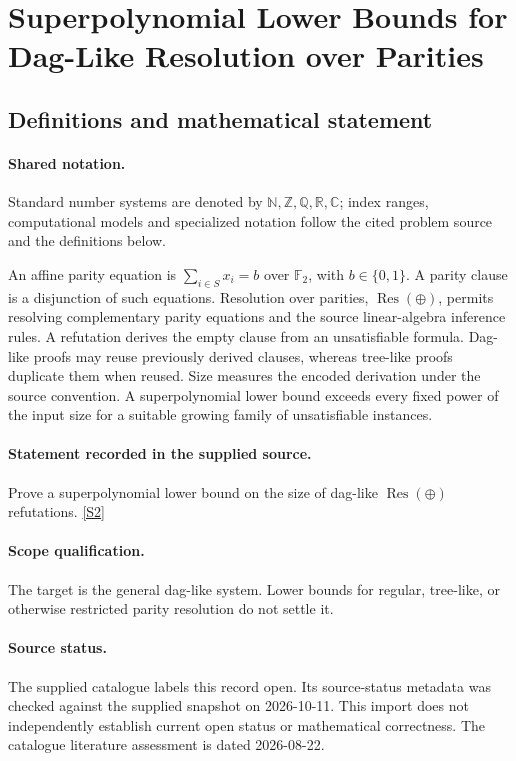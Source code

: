\documentclass[11pt]{article}
\newcommand{\sref}[2]{\hyperlink{source:#1:#2}{[S#2]}}
\begin{document}
\section{Superpolynomial Lower Bounds for Dag-Like Resolution over Parities}\label{statement}

\subsection{Definitions and mathematical statement}

\paragraph{Shared notation.}Standard number systems are denoted by $\mathbb N,\mathbb Z,\mathbb Q,\mathbb R,\mathbb C$; index ranges, computational models and specialized notation follow the cited problem source and the definitions below.


An affine parity equation is $\sum_{i\in S}x_i=b$ over $\mathbb F_2$, with $b\in\{0,1\}$. A parity clause is a disjunction of such equations. Resolution over parities, $\operatorname{Res}(\oplus)$, permits resolving complementary parity equations and the source linear-algebra inference rules. A refutation derives the empty clause from an unsatisfiable formula. Dag-like proofs may reuse previously derived clauses, whereas tree-like proofs duplicate them when reused. Size measures the encoded derivation under the source convention. A superpolynomial lower bound exceeds every fixed power of the input size for a suitable growing family of unsatisfiable instances.
\paragraph{Statement recorded in the supplied source.}
Prove a superpolynomial lower bound on the size of dag-like $\operatorname{Res}(\oplus)$ refutations. \sref{statement}{2}
\paragraph{Scope qualification.}
The target is the general dag-like system. Lower bounds for regular, tree-like, or otherwise restricted parity resolution do not settle it.
\paragraph{Source status.}
The supplied catalogue labels this record open. Its source-status metadata was checked against the supplied snapshot on 2026-10-11. This import does not independently establish current open status or mathematical correctness. The catalogue literature assessment is dated 2026-08-22.
\end{document}
